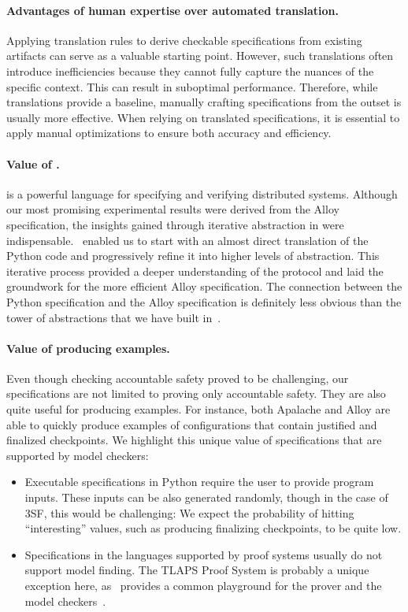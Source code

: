 \paragraph{Advantages of human expertise over automated translation.} Applying
translation rules to derive checkable specifications from existing artifacts can
serve as a valuable starting point. However, such translations often introduce
inefficiencies because they cannot fully capture the nuances of the specific
context. This can result in suboptimal performance. Therefore, while
translations provide a baseline, manually crafting specifications from the
outset is usually more effective. When relying on translated specifications, it is
essential to apply manual optimizations to ensure both accuracy and efficiency.

\paragraph{Value of \tlap{}.} \tlap{} is a powerful language for specifying and
verifying distributed systems. Although our most promising experimental results
were derived from the Alloy specification, the insights gained through
iterative abstraction in \tlap{} were indispensable.\ \tlap{} enabled us to
start with an almost direct translation of the Python code and progressively
refine it into higher levels of abstraction. This iterative process provided a
deeper understanding of the protocol and laid the groundwork for the more
efficient Alloy specification. The connection between the Python specification
and the Alloy specification is definitely less obvious than the tower of
abstractions that we have built in~\tlap{}.

\paragraph{Value of producing examples.} Even though checking accountable
safety proved to be challenging, our specifications are not limited to proving
only accountable safety. They are also quite useful for producing examples. For
instance, both Apalache and Alloy are able to quickly produce examples of
configurations that contain justified and finalized checkpoints. We highlight
this unique value of specifications that are supported by model checkers:

\begin{itemize}

  \item Executable specifications in Python require the user to provide program
    inputs. These inputs can be also generated randomly, though in the case of
    3SF, this would be challenging: We expect the probability of hitting
    ``interesting'' values, such as producing finalizing checkpoints, to be
    quite low.

  \item Specifications in the languages supported by proof systems usually do
    not support model finding. The TLAPS Proof System is probably a unique
    exception here, as~\tlap{} provides a common playground for the prover and the
    model checkers~\cite{KonnovKM22}.

\end{itemize}


